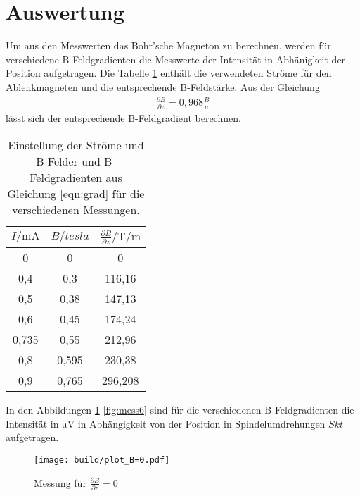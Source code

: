 \section{Auswertung}
\label{sec:Auswertung}
Um aus den Messwerten das Bohr'sche Magneton zu berechnen,
werden für verschiedene B-Feldgradienten die
Messwerte der Intensität in Abhänigkeit der Position aufgetragen.
Die Tabelle \ref{tab:strom} enthält die verwendeten Ströme für den
Ablenkmagneten und die entsprechende B-Feldstärke. Aus der
Gleichung
\begin{align}
  \frac{\partial B}{\partial z}=0,968\frac{B}{a} \label{eqn:grad}
\end{align}
lässt sich der entsprechende B-Feldgradient berechnen.
\begin{table}
\centering
\caption{Einstellung der Ströme und B-Felder und B-Feldgradienten aus Gleichung \eqref{eqn:grad} für die verschiedenen Messungen.}
\label{tab:strom}
\begin{tabular}{c c c}
\toprule
 $I/\si{\milli\ampere}$ & $B/\si{tesla}$ & $\frac{\partial B}{\partial z}/\si{\tesla\per\meter}$\\
\midrule
0     &  0     &  0        \\
0,4   & 0,3    & 116,16    \\
0,5   & 0,38   & 147,13    \\
0,6   & 0,45   & 174,24    \\
0,735 & 0,55   & 212,96    \\
0,8   & 0,595  & 230,38    \\
0,9   & 0,765  & 296,208   \\
\bottomrule
\end{tabular}
\end{table}

In den Abbildungen \ref{fig:mess0}-\ref{fig:mess6}
sind für die verschiedenen B-Feldgradienten
die Intensität in $\si{\micro\volt}$ in Abhängigkeit von der Position in
Spindelumdrehungen $Skt$ aufgetragen.

\begin{figure}
  \centering
  \texttt{[image: build/plot\_B=0.pdf]}
  \caption{Messung für $\frac{\partial B}{\partial z}=0$ }
  \label{fig:mess0}
\end{figure}

